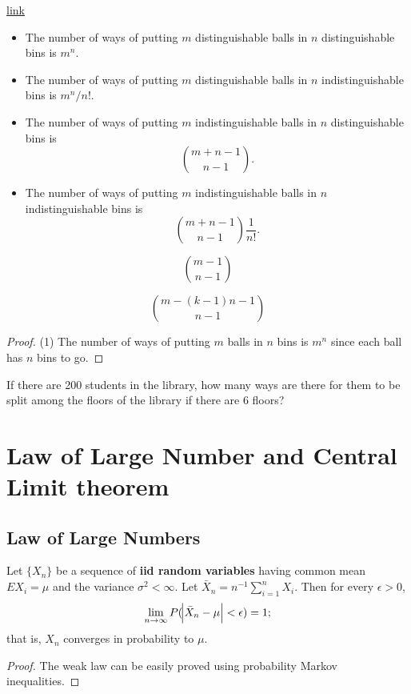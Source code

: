 \begin{refsection}
\begin{definition}
\end{definition}


\begin{lemma}\href{https://math.stackexchange.com/questions/26528/m-balls-n-boxes-probability-problem?noredirect=1&lq=1}{link}
\begin{itemize}
	\item The number of ways of putting $m$ distinguishable balls in $n$ distinguishable bins is $m^n$.
	\item The number of ways of putting $m$ distinguishable balls in $n$ indistinguishable bins is $m^n/n!$.
	\item The number of ways of putting $m$ indistinguishable balls in $n$ distinguishable bins is 
	$$\binom{m+n-1}{n-1}.$$
	\item The number of ways of putting $m$ indistinguishable balls in $n$ indistinguishable bins is 
	$$\binom{m+n-1}{n-1}\frac{1}{n!}.$$
	
\end{itemize}	
	
	
	
	$$\binom{m-1}{n-1}$$
	
	$$\binom{m-(k-1)n-1}{n-1}$$
	
\end{lemma}
\begin{proof}
(1)	
The number of ways of putting $m$ balls in $n$ bins is $m^n$ since each ball has $n$ bins to go.	
\end{proof}

\begin{example}
 If there are 200 students in the library, how many ways are there for them to be split among the floors of the library if there are 6 floors?	
 
 
\end{example}


\section{Law of Large Number and Central Limit theorem}
\subsection{Law of Large Numbers}
\begin{theorem}\label{ch:theory-of-probability:th:weaklawlargenumber}
\cite[232]{casella2002statistical}Let $\{X_n\}$ be a sequence of \textbf{iid random variables} having common mean $EX_i = \mu$ and the variance $\sigma^2 < \infty$. Let $\bar{X}_n = n^{-1}\sum_{i=1}^n X_i$. Then for every $\epsilon > 0$,
$$\lim_{n\to \infty} P(\abs{\bar{X}_n - \mu} < \epsilon) = 1;$$
that is, $X_n$ converges in probability to $\mu$. 
\end{theorem}
\begin{proof}
 The weak law can be easily proved using probability Markov inequalities.
\end{proof}


\end{refsection}
